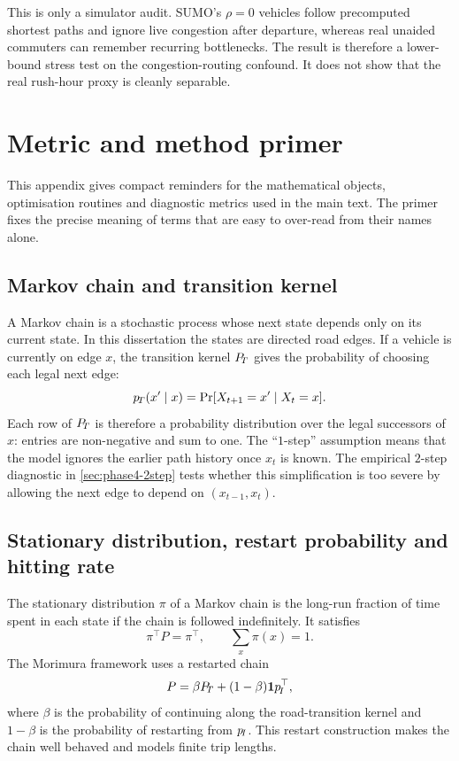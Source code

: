 This is only a simulator audit. SUMO's $\rho=0$ vehicles follow
precomputed shortest paths and ignore live congestion after departure,
whereas real unaided commuters can remember recurring bottlenecks. The
result is therefore a lower-bound stress test on the congestion-routing
confound. It does not show that the real rush-hour proxy is cleanly
separable.

\section{Metric and method primer}
\label{app:metrics-primer}

This appendix gives compact reminders for the mathematical objects,
optimisation routines and diagnostic metrics used in the main text. The
primer fixes the precise meaning of terms that are easy to over-read from
their names alone.

\subsection{Markov chain and transition kernel}
\label{app:markov-chain-primer}

A Markov chain is a stochastic process whose next state depends only on
its current state. In this dissertation the states are directed road
edges. If a vehicle is currently on edge $x$, the transition kernel
$P_{\!T}$ gives the probability of choosing each legal next edge:
\[
p_{\!T}(x'\mid x) = \Pr[X_{t+1}=x' \mid X_t=x].
\]
Each row of $P_{\!T}$ is therefore a probability distribution over the
legal successors of $x$: entries are non-negative and sum to one. The
``$1$-step'' assumption means that the model ignores the earlier path
history once $x_t$ is known. The empirical $2$-step diagnostic in
\cref{sec:phase4-2step} tests whether this simplification is too severe
by allowing the next edge to depend on $(x_{t-1},x_t)$.

\subsection{Stationary distribution, restart probability and hitting rate}
\label{app:stationary-primer}

The stationary distribution $\pi$ of a Markov chain is the long-run
fraction of time spent in each state if the chain is followed
indefinitely. It satisfies
\[
\pi^\top P = \pi^\top,\qquad \sum_x \pi(x)=1.
\]
The Morimura framework uses a restarted chain
\[
P = \beta P_{\!T} + (1-\beta)\bm{1}p_{\!I}^\top,
\]
where $\beta$ is the probability of continuing along the road-transition
kernel and $1-\beta$ is the probability of restarting from $p_{\!I}$. This
restart construction makes the chain well behaved and models finite trip
lengths.


